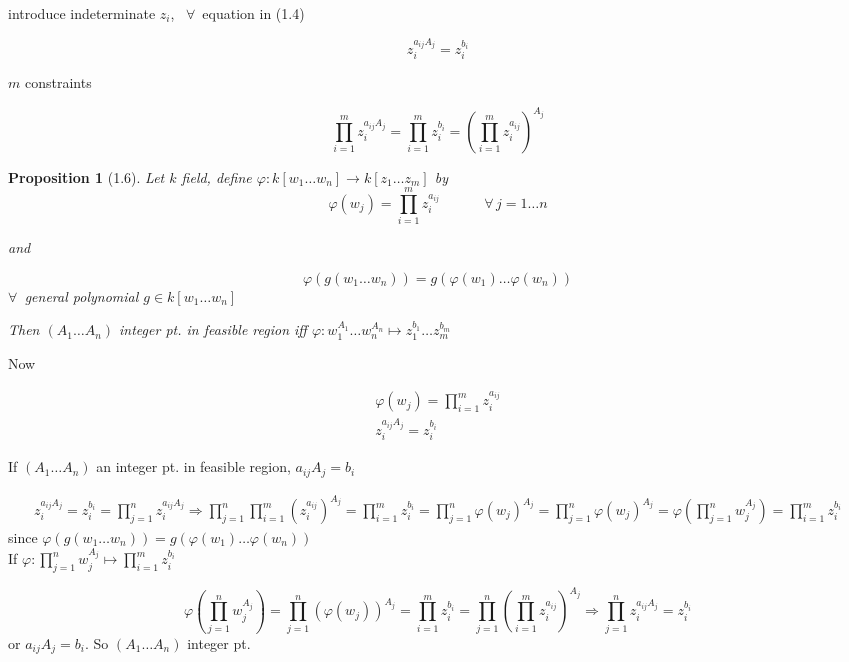 \documentclass[10pt]{amsart}
\newtheorem{proposition}{Proposition}
\newcommand{\exercisehead}[1]
  { \smallskip
   \noindent{\small\bf Exercise #1.}
  }
\begin{document}
\begin{multicols*}{2}
introduce indeterminate $z_i$, \, $\forall \, $ equation in (1.4)

\[
z_i^{a_{ij} A_j} = z_i^{b_i}
\]

$m$ constraints

\[
\prod_{i=1}^m z_i^{a_{ij}A_j} = \prod_{i=1}^m z_i^{b_i} = \left( \prod_{i=1}^m z_i^{a_{ij}} \right)^{ A_j}
\]

\begin{proposition}[1.6]
  Let $k$ field, define $\varphi: k[w_1 \dots w_n] \to k[z_1 \dots z_m]$ by 
\[
\varphi(w_j) = \prod_{i=1}^m z_i^{a_{ij}} \quad \quad \quad \, \forall \, j = 1 \dots n 
\]

and 

\[
\varphi(g(w_1 \dots w_n) ) = g(\varphi(w_1) \dots \varphi(w_n))
\]
$\forall \, $ general polynomial $g\in k[w_1 \dots w_n]$

Then $(A_1 \dots A_n)$ integer pt. in feasible region iff $\varphi: w_1^{A_1} \dots w_n^{A_n} \mapsto z_1^{b_1} \dots z_m^{b_m}$



\end{proposition}

\exercisehead{3}

Now 

\[
\begin{gathered}
\varphi(w_j) = \prod_{i=1}^m z_i^{a_{ij}} \\
z_i^{a_{ij} A_j} = z_i^{b_i}
\end{gathered}
\]

If $(A_1 \dots A_n)$ an integer pt. in feasible region, $a_{ij} A_j = b_i$

\[
\begin{gathered}
z_i^{a_{ij}A_j } = z_i^{b_i} = \prod_{j=1}^n z_i^{a_{ij} A_j} \Longrightarrow \prod_{j=1}^n \prod_{i=1}^m (z_i^{a_{ij} })^{A_j} = \prod_{i=1}^m z_i^{b_i} = \prod_{j=1}^n \varphi(w_j)^{ A_j} = \prod_{j=1}^n \varphi(w_j)^{A_j} = \varphi\left( \prod_{j=1}^n w_j^{ A_j } \right) = \prod_{i=1}^m z_i^{b_i}
\end{gathered}
\]
since $\varphi(g(w_1 \dots w_n)) = g(\varphi(w_1) \dots \varphi(w_n))$ \\

If $\varphi: \prod_{j=1}^n w_j^{A_j} \mapsto \prod_{i=1}^m z_i^{b_i}$

\[
\varphi\left( \prod_{j=1}^n w_j^{A_j} \right) = \prod_{j=1}^n (\varphi(w_j))^{A_j} = \prod_{i=1}^m z_i^{b_i} = \prod_{j=1}^n \left( \prod_{i=1}^m z_i^{a_{ij}} \right)^{ A_j} \Longrightarrow \prod_{j=1}^n z_i^{a_{ij} A_j} = z_i^{b_i}
\]
or $a_{ij}A_j = b_i$.  So $(A_1\dots A_n)$ integer pt.  





\end{multicols*}
\end{document}
